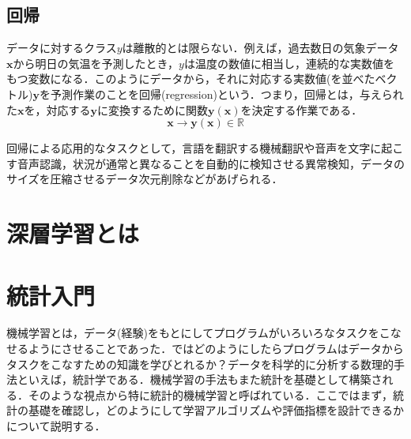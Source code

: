 \documentclass[a4paper,11pt]{jsreport}
\begin{document}
\subsection*{回帰}
データに対するクラス$y$は離散的とは限らない．例えば，過去数日の気象データ$\bm{x}$から明日の気温を予測したとき，$y$は温度の数値に相当し，連続的な実数値をもつ変数になる．このようにデータから，それに対応する実数値(を並べたベクトル)$\bm{y}$を予測作業のことを回帰(regression)という．つまり，回帰とは，与えられた$\bm{x}$を，対応する$\bm{y}$に変換するために関数$\bm{y}(\bm{x})$を決定する作業である．
\begin{equation}
  \bm{x} \longrightarrow \bm{y}(\bm{x}) \in \mathbb{R}
\end{equation}
\par
回帰による応用的なタスクとして，言語を翻訳する機械翻訳や音声を文字に起こす音声認識，状況が通常と異なることを自動的に検知させる異常検知，データのサイズを圧縮させるデータ次元削除などがあげられる．
\section{深層学習とは}
\section{統計入門}
機械学習とは，データ(経験)をもとにしてプログラムがいろいろなタスクをこなせるようにさせることであった．ではどのようにしたらプログラムはデータからタスクをこなすための知識を学びとれるか？データを科学的に分析する数理的手法といえば，統計学である．機械学習の手法もまた統計を基礎として構築される．そのような視点から特に統計的機械学習と呼ばれている．ここではまず，統計の基礎を確認し，どのようにして学習アルゴリズムや評価指標を設計できるかについて説明する．
\end{document}
